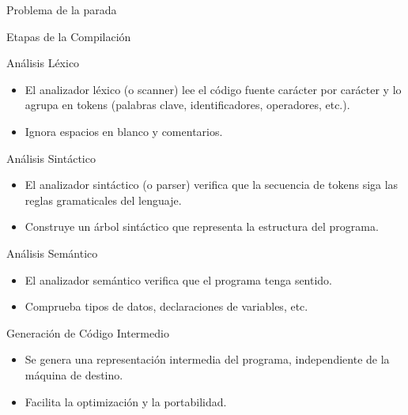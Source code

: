 \documentclass{beamer}
\begin{document}
\begin{frame}{Problema de la parada}
\begin{frame}{Etapas de la Compilación}
	\end{frame}
	
	\begin{frame}{Análisis Léxico}
		
		\begin{itemize}
			\item El analizador léxico (o scanner) lee el código fuente carácter por carácter y lo agrupa en tokens (palabras clave, identificadores, operadores, etc.).
			\item Ignora espacios en blanco y comentarios.
		\end{itemize}
		
	\end{frame}
	
	\begin{frame}{Análisis Sintáctico}
		
		\begin{itemize}
			\item El analizador sintáctico (o parser) verifica que la secuencia de tokens siga las reglas gramaticales del lenguaje.
			\item Construye un árbol sintáctico que representa la estructura del programa.
		\end{itemize}
		
	\end{frame}
	
	\begin{frame}{Análisis Semántico}
		
		\begin{itemize}
			\item El analizador semántico verifica que el programa tenga sentido.
			\item Comprueba tipos de datos, declaraciones de variables, etc.
		\end{itemize}
		
	\end{frame}
	
	\begin{frame}{Generación de Código Intermedio}
		
		\begin{itemize}
			\item Se genera una representación intermedia del programa, independiente de la máquina de destino.
			\item Facilita la optimización y la portabilidad.
		\end{itemize}
		
	\end{frame}
	

\end{frame}
\end{document}
